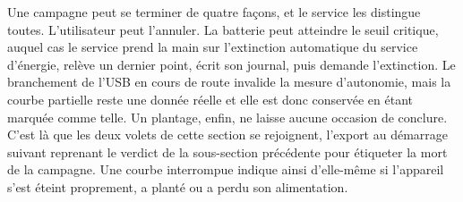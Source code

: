 Une campagne peut se terminer de quatre façons, et le service les distingue toutes. L'utilisateur peut l'annuler. La batterie peut atteindre le seuil critique, auquel cas le service prend la main sur l'extinction automatique du service d'énergie, relève un dernier point, écrit son journal, puis demande l'extinction. Le branchement de l'USB en cours de route invalide la mesure d'autonomie, mais la courbe partielle reste une donnée réelle et elle est donc conservée en étant marquée comme telle. Un plantage, enfin, ne laisse aucune occasion de conclure. C'est là que les deux volets de cette section se rejoignent, l'export au démarrage suivant reprenant le verdict de la sous-section précédente pour étiqueter la mort de la campagne. Une courbe interrompue indique ainsi d'elle-même si l'appareil s'est éteint proprement, a planté ou a perdu son alimentation.